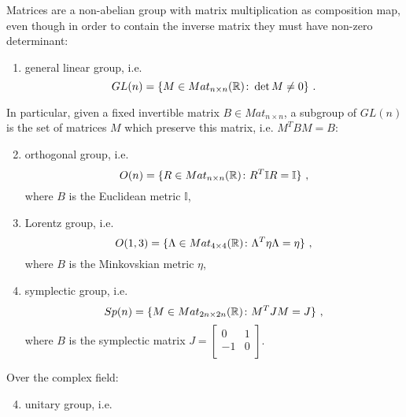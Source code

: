     \begin{example}
        Matrices are a non-abelian group with matrix multiplication as composition map, even though in order to contain the inverse matrix they must have non-zero determinant:
        \begin{enumerate}
            \item general linear group, i.e. 
            \begin{equation}\label{gln}
                GL(n) = \{M \in Mat_{n \times n}(\mathbb R)\colon\det M \neq 0\} ~.
            \end{equation}
        \end{enumerate}
        In particular, given a fixed invertible matrix $B \in Mat_{n \times n}$, a subgroup of $GL(n)$ is the set of matrices $M$ which preserve this matrix, i.e. $M^T B M = B$:
        \begin{enumerate}
        \setcounter{enumi}{1}
            \item orthogonal group, i.e. 
                \begin{equation*}
                    O(n) = \{R \in Mat_{n \times n}(\mathbb R)\colon R^T \mathbb I R = \mathbb I\} ~,
                \end{equation*}
                where $B$ is the Euclidean metric $\mathbb I$,
            \item Lorentz group, i.e. 
                \begin{equation*}
                    O(1, 3) = \{\Lambda \in Mat_{4 \times 4}(\mathbb R)\colon\Lambda^T \eta \Lambda = \eta\} ~,
                \end{equation*} 
                where $B$ is the Minkovskian metric $\eta$,
            \item symplectic group, i.e. 
                \begin{equation*}
                    Sp(n) = \{M \in Mat_{2n \times 2n}(\mathbb R)\colon M^T J M = J\} ~,
                \end{equation*}
                where $B$ is the symplectic matrix $J = \begin{bmatrix} 0 & 1 \\ -1 & 0 \\ \end{bmatrix}$.
        \end{enumerate}
        Over the complex field:
        \begin{enumerate}
        \setcounter{enumi}{3}
            \item unitary group, i.e. 

\end{enumerate}
\end{example}
